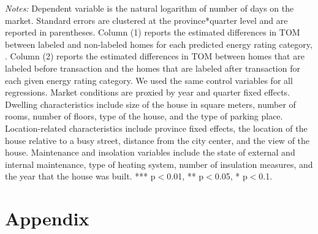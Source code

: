 \documentclass[12pt]{article}
\begin{document}
\begin{table}[H]
\begin{tabular}{lcccc}
    \end{tabular}%
\begin{tablenotes}
\scriptsize
\item \textit{Notes:} Dependent variable is the natural logarithm of number of days on the market. Standard errors are clustered at the province*quarter level and are reported in parentheses. Column (1) reports the estimated differences in TOM  between labeled and non-labeled homes for each predicted energy rating category, . Column (2) reports the estimated differences in TOM  between homes that are labeled before transaction and the homes that are labeled after transaction for each given energy rating category. We used the same control variables for all regressions. Market conditions are proxied by year and quarter fixed effects. Dwelling characteristics include size of the house in square meters, number of rooms, number of floors, type of the house, and the type of parking place. Location-related characteristics include province fixed effects, the location of the house relative to a busy street, distance from the city center, and the view of the house. Maintenance and insolation variables include the state of external and internal maintenance, type of heating system, number of insulation measures, and the year that the house was built. *** p$<$0.01, ** p$<$0.05, * p$<$0.1. 
\end{tablenotes}

  \label{tab:addlabel}%
\end{table}%










\appendix
\section*{Appendix}
\end{document}
